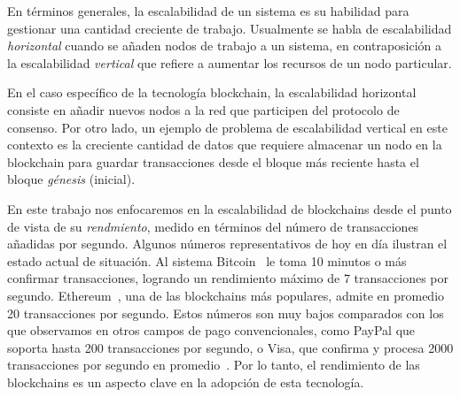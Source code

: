 En términos generales, la escalabilidad de un sistema es su habilidad para gestionar una
cantidad creciente de trabajo.
%
Usualmente se habla de escalabilidad \emph{horizontal} cuando se añaden nodos de trabajo a un sistema,
en contraposición a la escalabilidad \emph{vertical} que refiere a aumentar los recursos de un nodo particular.

En el caso específico de la tecnología blockchain, la escalabilidad horizontal consiste en añadir nuevos
nodos a la red que participen del protocolo de consenso.
%
Por otro lado, un ejemplo de problema de escalabilidad vertical en este contexto es la creciente cantidad de datos
que requiere almacenar un nodo en la blockchain para guardar transacciones desde el bloque más reciente
hasta el bloque \emph{génesis} (inicial).

En este trabajo nos enfocaremos en la escalabilidad de blockchains desde el punto de vista de su \emph{rendmiento}, medido
en términos del número de transacciones añadidas por segundo.
%
Algunos números representativos de hoy en día ilustran el estado actual de situación.
Al sistema Bitcoin~\cite{nakamoto06bitcoin} le toma 10 minutos o más
confirmar transacciones, logrando un rendimiento máximo de 7 transacciones por segundo.
%
Ethereum~\cite{wood2014ethereum}, una de las blockchains más populares, admite en promedio 20 transacciones por segundo.
%
Estos números son muy bajos comparados con los que observamos en otros campos de pago convencionales,
como PayPal que soporta hasta 200 transacciones por segundo, o Visa, que confirma y procesa 2000 transacciones
por segundo en promedio~\cite{tps.numbers}.
%
Por lo tanto, el rendimiento de las blockchains es un aspecto clave en la adopción de esta tecnología.
%



